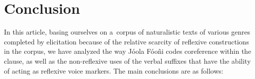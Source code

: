 \documentclass[output=paper]{langscibook}
\begin{document}
\ea\label{ex:Creissels:44}
  \z
\z


\section{Conclusion}%
\label{sec:Creissels:conclusion}

In this article, basing ourselves on a~corpus of naturalistic texts of various
genres completed by elicitation because of the relative scarcity of reflexive
constructions in the corpus, we have analyzed the way Jóola Fóoñi codes
coreference within the clause, as well as the non-reflexive uses of the verbal
suffixes that have the ability of acting as reflexive voice markers.  The main
conclusions are as follows:
\end{document}

